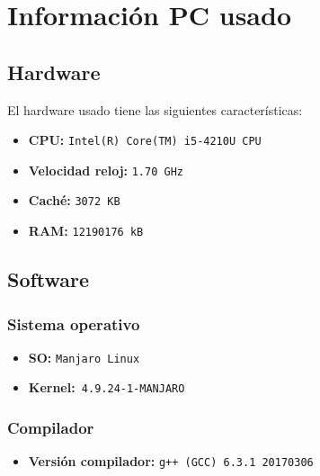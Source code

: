 



\maketitle %
\newpage %
\tableofcontents %
\listoffigures
\newpage


\section{Información PC usado}

\subsection{Hardware}
El hardware usado tiene las siguientes características:
\begin{itemize}
  \item \textbf{CPU:} \texttt{Intel(R) Core(TM) i5-4210U CPU}
  \item \textbf{Velocidad reloj:} \texttt{1.70 GHz}
  \item \textbf{Caché:} \texttt{3072 KB}
  \item \textbf{RAM:} \texttt{12190176 kB  }
\end{itemize}
\subsection{Software}
\subsubsection{Sistema operativo}
\begin{itemize}
  \item \textbf{SO:} \texttt{Manjaro Linux}
  \item \textbf{Kernel:}\texttt{ 4.9.24-1-MANJARO}
\end{itemize}
\subsubsection{Compilador}
\begin{itemize}
  \item \textbf{Versión compilador:} \texttt{g++ (GCC) 6.3.1 20170306}
\end{itemize}

